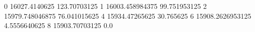 0 16027.4140625 123.70703125
1 16003.458984375 99.751953125
2 15979.748046875 76.041015625
4 15934.47265625 30.765625
6 15908.2626953125 4.5556640625
8 15903.70703125 0.0
